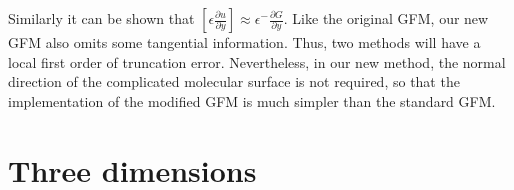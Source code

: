 Similarly it can be shown that $\left[\epsilon \frac{\partial u}{\partial y}\right] \approx   \epsilon^- \frac{\partial G}{\partial y}$. Like the original GFM, our new GFM also omits some tangential information. Thus, two methods will have a local first order of truncation error. Nevertheless, in our new method, the normal direction of the complicated molecular surface is not required, so that the implementation of the modified GFM is much simpler than the standard GFM. 




\section{Three dimensions}

